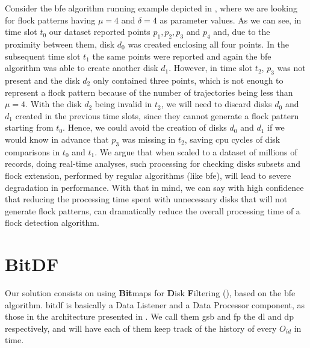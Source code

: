Consider the \ac{bfe} algorithm running example depicted in , where we are looking for flock patterns
having $\mu=4$ and $\delta=4$ as parameter values. As we can see, in time slot $t_0$ our dataset reported points
$p_1,p_2,p_3$ and $p_4$ and, due to the proximity between them, disk $d_0$ was created enclosing all four points.  In
the subsequent time slot $t_1$ the same points were reported and again the \ac{bfe} algorithm was able to create another
disk $d_1$. However, in time slot $t_2$, $p_3$ was not present and the disk $d_2$ only contained three points, which is
not enough to represent a flock pattern because of the number of trajectories being less than $\mu = 4$. With the disk
$d_2$ being invalid in $t_2$, we will need to discard disks $d_0$ and $d_1$ created in the previous time slots, since
they cannot generate a flock pattern starting from $t_0$. Hence, we could avoid the creation of disks $d_0$ and $d_1$ if
we would know in advance that $p_3$ was missing in $t_2$, saving \ac{cpu} cycles of disk comparisons in $t_0$ and $t_1$.
We argue that when scaled to a dataset of millions of records, doing real-time analyses, such processing for checking
disks subsets and flock extension, performed by regular algorithms (like \ac{bfe}), will lead to severe degradation in
performance. With that in mind, we can say with high confidence that reducing the processing time spent with unnecessary
disks that will not generate flock patterns, can dramatically reduce the overall processing time of a flock detection
algorithm.

\section{BitDF}
\label{sec:bitdf}

Our solution consists on using \textbf{Bit}maps for \textbf{D}isk \textbf{F}iltering (\label{acro:bitdf}),
based on the \ac{bfe} algorithm. \ac{bitdf} is basically a Data Listener and a Data Processor component, as those in the
architecture presented in . We call them \ac{gsb} and \ac{fp} the \ac{dl} and \ac{dp}
respectively, and will have each of them keep track of the history of every $O_{id}$ in time.


